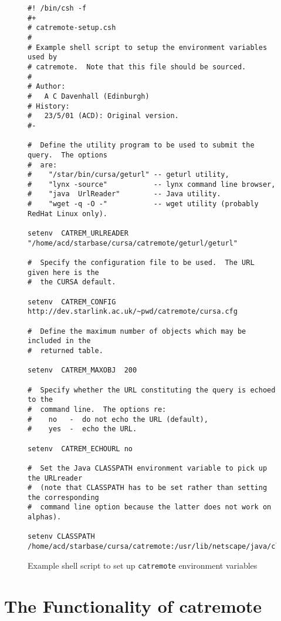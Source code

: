 \documentclass[twoside,11pt]{article}
\newcommand{\latex}[1]{#1}
\newcommand{\xlabel}[1]{}
\renewcommand{\_}{\texttt{\symbol{95}}}
\begin{document}
\begin{figure}[htbp]
\latex{\begin{small}}
\begin{verbatim}
#! /bin/csh -f
#+
# catremote-setup.csh
#
# Example shell script to setup the environment variables used by
# catremote.  Note that this file should be sourced.
#
# Author:
#   A C Davenhall (Edinburgh)
# History:
#   23/5/01 (ACD): Original version.
#-

#  Define the utility program to be used to submit the query.  The options
#  are:
#    "/star/bin/cursa/geturl" -- geturl utility, 
#    "lynx -source"           -- lynx command line browser,
#    "java  UrlReader"        -- Java utility.
#    "wget -q -O -"           -- wget utility (probably RedHat Linux only).

setenv  CATREM_URLREADER "/home/acd/starbase/cursa/catremote/geturl/geturl"

#  Specify the configuration file to be used.  The URL given here is the
#  the CURSA default.

setenv  CATREM_CONFIG  http://dev.starlink.ac.uk/~pwd/catremote/cursa.cfg

#  Define the maximum number of objects which may be included in the
#  returned table.

setenv  CATREM_MAXOBJ  200

#  Specify whether the URL constituting the query is echoed to the
#  command line.  The options re:
#    no   -  do not echo the URL (default),
#    yes  -  echo the URL.

setenv  CATREM_ECHOURL no

#  Set the Java CLASSPATH environment variable to pick up the URLreader
#  (note that CLASSPATH has to be set rather than setting the corresponding
#  command line option because the latter does not work on alphas).

setenv CLASSPATH /home/acd/starbase/cursa/catremote:/usr/lib/netscape/java/classes
\end{verbatim}
\latex{\end{small}}

\begin{quote}
\caption{Example shell script to set up {\tt catremote} environment
variables  \label{SETENVAR} }
\end{quote}

\end{figure}


\section{\xlabel{FUNC}\label{FUNC}The Functionality of catremote}
\end{document}

